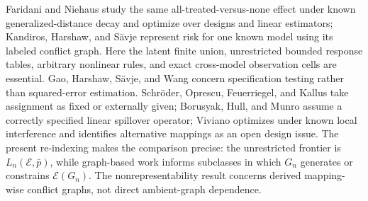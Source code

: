 Faridani and Niehaus study the same all-treated-versus-none effect under known generalized-distance decay and optimize over designs and linear estimators; Kandiros, Harshaw, and Sävje represent risk for one known model using its labeled conflict graph. Here the latent finite union, unrestricted bounded response tables, arbitrary nonlinear rules, and exact cross-model observation cells are essential. Gao, Harshaw, Sävje, and Wang concern specification testing rather than squared-error estimation. Schröder, Oprescu, Feuerriegel, and Kallus take assignment as fixed or externally given; Borusyak, Hull, and Munro assume a correctly specified linear spillover operator; Viviano optimizes under known local interference and identifies alternative mappings as an open design issue. The present re-indexing makes the comparison precise: the unrestricted frontier is \(L_n(\mathcal E,\bar p)\), while graph-based work informs subclasses in which \(G_n\) generates or constrains \(\mathcal E(G_n)\). The nonrepresentability result concerns derived mapping-wise conflict graphs, not direct ambient-graph dependence.